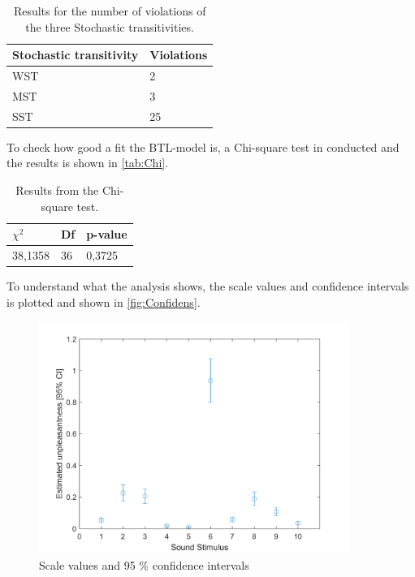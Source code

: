 \begin{table}[H]
\centering
\begin{tabular}{@{}ll@{}}
\toprule
Stochastic transitivity     & Violations \\ \midrule
WST      & 2   \\
MST      & 3   \\
SST      & 25   \\ \bottomrule
\end{tabular}
\caption{Results for the number of violations of the three Stochastic transitivities.}
\label{tab:Stocha}
\end{table} 

\noindent To check how good a fit the BTL-model is, a Chi-square test in conducted and the results is shown in \autoref{tab:Chi}. 

\begin{table}[H]
\centering
\begin{tabular}{@{}lll@{}}
\toprule
$\chi^{2}$     & Df & p-value \\ \midrule
38,1358      & 36  &  0,3725   \\ \bottomrule
\end{tabular}
\caption{Results from the Chi-square test.}
\label{tab:Chi}
\end{table} 

\noindent To understand what the analysis shows, the scale values and confidence intervals is plotted and shown in \autoref{fig:Confidens}. 

\begin{figure}[H]
\centering
\includegraphics[width = 0.90\textwidth]{Figure/Confidens.png} 
\caption{Scale values and 95 \% confidence intervals}
\label{fig:Confidens}
\end{figure}